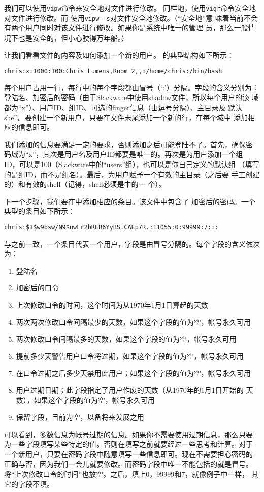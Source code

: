 我们可以使用\texttt{vipw}命令来安全地对文件进行修改。
同样地，使用\texttt{vigr}命令安全地对文件进行修改。而
使用\texttt{vipw -s}对文件安全地修改。（``安全地''意
味着当前不会有两个用户同时对该文件进行修改。如果你是系统中唯一的管理
员，那么一般情况下也是安全的，但小心驶得万年船。）

让我们看看文件的内容及如何添加一个新的用户。
的典型结构如下所示：
\begin{Verbatim}[frame=single, commandchars=\\\{\}]
chris:x:1000:100:Chris Lumens,Room 2,,:/home/chris:/bin/bash
\end{Verbatim}
每个用户占用一行，每行中的每个字段都由冒号（`:'）分隔。字段的含义分别为：
登陆名、加密后的密码（由于Slackware中使用shadow文件，所以每个用户的该
域都为``x''）、用户ID、组ID、可选的finger信息（由逗号分隔）、主目录及
默认shell。要创建一个新用户，只要在文件末尾添加一个新的行，在每个域中
添加相应的信息即可。

我们添加的信息要满足一定的要求，否则添加之后可能登陆不了。首先，确保密
码域为``x''，其次是用户名及用户ID都要是唯一的。再次是为用户添加一个组
ID，可以是100（Slackware中的``users''组），也可以是你自己定义的默认组
（填写的是组ID，而不是组名）。最后，为用户赋予一个有效的主目录（之后要
手工创建的）和有效的shell（记得，shell必须是中的一
个）。

下一个步骤，我们要在中添加相应的条目。该文件中包含了
加密后的密码。一个典型的条目如下所示：
\begin{Verbatim}[frame=single, commandchars=\\\{\}]
chris:$1$w9bsw/N9$uwLr2bRER6YyBS.CAEp7R.:11055:0:99999:7:::
\end{Verbatim}
与之前一致，一个条目代表一个用户，字段是由冒号分隔的。每个字段的含义依次为：
\begin{enumerate}
\item 登陆名
\item 加密后的口令
\item 上次修改口令的时间，这个时间为从1970年1月1日算起的天数
\item 两次两次修改口令间隔最少的天数，如果这个字段的值为空，帐号永久可用
\item 两次修改口令间隔最多的天数，如果这个字段的值为空，帐号永久可用
\item 提前多少天警告用户口令将过期，如果这个字段的值为空，帐号永久可用
\item 在口令过期之后多少天禁用此用户；如果这个字段的值为空，帐号永久可用
\item 用户过期日期；此字段指定了用户作废的天数（从1970年的1月1日开始的
天数），如果这个字段的值为空，帐号永久可用
\item 保留字段，目前为空，以备将来发展之用
\end{enumerate}
可以看到，多数信息为帐号过期的信息。如果你不需要使用过期信息，那么只要
为一些字段填写某些特定的值。否则在填写之前就要经过一些思考和计算。对于
一个新用户，只要在密码字段中随意填写一些信息即可。现在不需要担心密码的
正确与否，因为我们一会儿就要修改。而密码字段中唯一不能包括的就是冒号。
将``上次修改口令的时间''也放空。之后，填上0，99999和7，就像例子中一样，
其它的字段不填。

